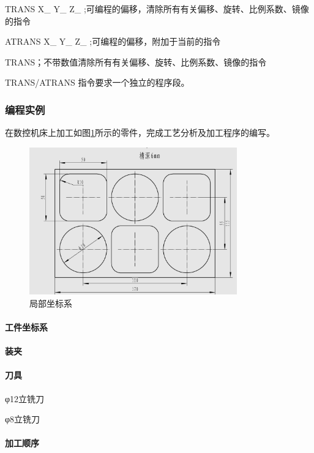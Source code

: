 TRANS X\_ Y\_ Z\_ ;可编程的偏移，清除所有有关偏移、旋转、比例系数、镜像的指令 

ATRANS X\_ Y\_ Z\_ ;可编程的偏移，附加于当前的指令 

TRANS；不带数值清除所有有关偏移、旋转、比例系数、镜像的指令 

TRANS/ATRANS 指令要求一个独立的程序段。

\subsubsection{编程实例}
在数控机床上加工如图\ref{局部坐标系}所示的零件，完成工艺分析及加工程序的编写。

\begin{figure}
	\centering	\includegraphics[width=0.8\textwidth]{images/6-1.jpg}
	\caption{局部坐标系} \label{局部坐标系}
\end{figure}

\paragraph{工件坐标系}
\paragraph{装夹}
\paragraph{刀具}
φ12立铣刀

φ8立铣刀
\paragraph{加工顺序}


